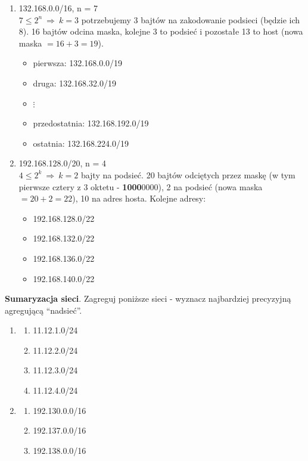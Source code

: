 \documentclass[12pt]{article}
\begin{document}
    \begin{enumerate}
        \item 132.168.0.0/16, n = 7\\
        $7 \leq 2^n ~ \Rightarrow ~ k = 3$ potrzebujemy 3 bajtów na zakodowanie podsieci (będzie ich 8). 16 bajtów odcina
        maska, kolejne 3 to podsieć i pozostałe 13 to host (nowa maska $= 16 + 3 = 19$).
        \begin{itemize}
            \item pierwsza: 132.168.0.0/19
            \item druga: 132.168.32.0/19
            \item $\vdots$
            \item przedostatnia: 132.168.192.0/19
            \item ostatnia: 132.168.224.0/19
        \end{itemize}

        \item 192.168.128.0/20, n = 4\\
        $4 \leq 2^k ~ \Rightarrow ~ k = 2$ bajty na podsieć. 20 bajtów odciętych przez maskę (w tym pierwsze cztery
        z 3 oktetu - \textbf{1000}0000), 2 na podsieć (nowa maska $=20+2=22$), 10 na adres hosta. Kolejne adresy:
        \begin{itemize}
            \item 192.168.128.0/22
            \item 192.168.132.0/22
            \item 192.168.136.0/22
            \item 192.168.140.0/22
        \end{itemize}
    \end{enumerate}

    \begin{exercise}
        \textbf{Sumaryzacja sieci}. Zagreguj poniższe sieci - wyznacz najbardziej precyzyjną agregującą ``nadsieć''.
        \begin{enumerate}
            \item
            \begin{enumerate}[label=(\Alph*)]
                \item 11.12.1.0/24
                \item 11.12.2.0/24
                \item 11.12.3.0/24
                \item 11.12.4.0/24
            \end{enumerate}
            \item
            \begin{enumerate}[label=(\Alph*)]
                \item 192.130.0.0/16
                \item 192.137.0.0/16
                \item 192.138.0.0/16
            \end{enumerate}
        \end{enumerate}
    \end{exercise}
\end{document}
